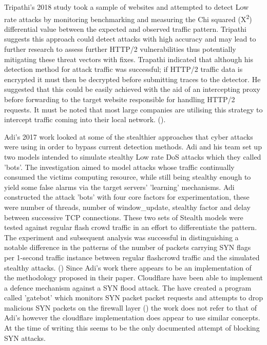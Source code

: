 Tripathi's 2018 study took a sample of websites and attempted to detect Low rate attacks by monitoring benchmarking and measuring the Chi squared (X\textsuperscript{\small2}) differential value between the expected and observed traffic pattern. Tripathi suggests this approach could detect attacks with high accuracy and may lead to further research to assess further HTTP/2 vulnerabilities thus potentially mitigating these threat vectors with fixes. Trapathi indicated that although his detection method for attack traffic was successful; if HTTP/2 traffic data is encrypted it must then be decrypted before submitting traces to the detector. He suggested that this could be easily achieved with the aid of an intercepting proxy before forwarding to the target website responsible for handling HTTP/2 requests. It must be noted that most large companies are utilising this strategy to intercept traffic coming into their local network. (\cite{tripathi2018slow}). 

Adi's 2017 work looked at some of the stealthier approaches that cyber attacks were using in order to bypass current detection methods. Adi and his team set up two models intended to simulate stealthy Low rate DoS attacks which they called 'bots'. The investigation aimed to model attacks whose traffic continually consumed the victims computing resource, while still being stealthy enough to yield some false alarms via the target servers' 'learning' mechanisms. Adi constructed the attack 'bots' with four core factors for experimentation, these were number of threads, number of window\_update, stealthy factor and delay between successive TCP connections. These two sets of Stealth models were tested against regular flash crowd traffic in an effort to differentiate the pattern. The experiment and subsequent analysis was successful in distinguishing a notable difference in the patterns of the number of packets carrying SYN flags per 1-second traffic instance between regular flashcrowd traffic and the simulated stealthy attacks. (\cite{adi2017stealthy}) Since Adi's work there appears to be an implementation of the methodology proposed in their paper. Cloudflare have been able to implement a defence mechanism against a SYN flood attack. The have created a program called 'gatebot' which monitors SYN packet packet requests and attempts to drop malicious SYN packets on the firewall layer (\cite{CFSYN}) the work does not refer to that of Adi's however the cloudflare implementation does appear to use similar concepts. At the  time of writing this seems to be the only documented attempt of blocking SYN attacks.